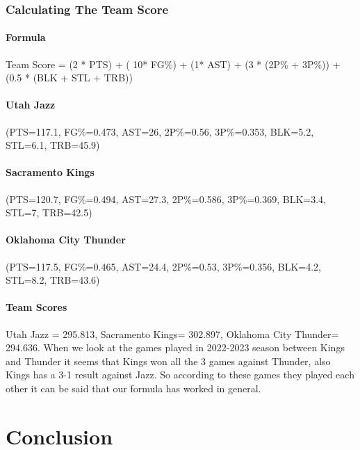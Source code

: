 \documentclass[conference]{IEEEtran}
\begin{document}
\subsubsection{Calculating The Team Score}
\paragraph {Formula}
\vspace{\baselineskip}
Team Score = (2 * PTS) + ( 10* FG\%) + (1* AST) + (3 * (2P\% + 3P\%)) + (0.5 * (BLK + STL + TRB))
\vspace{\baselineskip}

\paragraph {Utah Jazz}
(PTS=117.1, FG\%=0.473, AST=26, 2P\%=0.56, 3P\%=0.353, BLK=5.2, STL=6.1, TRB=45.9)
\vspace{\baselineskip}

\paragraph {Sacramento Kings}
(PTS=120.7, FG\%=0.494, AST=27.3, 2P\%=0.586, 3P\%=0.369, BLK=3.4, STL=7, TRB=42.5)
\vspace{\baselineskip}

\paragraph {Oklahoma City Thunder}
(PTS=117.5, FG\%=0.465, AST=24.4, 2P\%=0.53, 3P\%=0.356, BLK=4.2, STL=8.2, TRB=43.6)
\vspace{\baselineskip}


\paragraph {Team Scores}
Utah Jazz = 295.813, Sacramento Kings= 302.897, Oklahoma City Thunder= 294.636. When we look at the games played in 2022-2023 season between Kings and Thunder it seems that Kings won all the 3 games against Thunder, also Kings has a 3-1 result against Jazz. So according to these games they played each other it can be said that our formula has worked in general.
\vspace{\baselineskip}\vspace{\baselineskip}
\vspace{\baselineskip}


\section{Conclusion}
\vspace{\baselineskip}
\vspace{\baselineskip}
\end{document}
